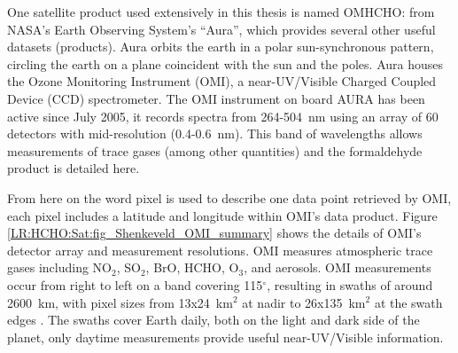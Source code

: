   One satellite product used extensively in this thesis is named OMHCHO: from NASA's Earth Observing System's ``Aura'', which provides several other useful datasets (products).
  Aura orbits the earth in a polar sun-synchronous pattern, circling the earth on a plane coincident with the sun and the poles.
  Aura houses the Ozone Monitoring Instrument (OMI), a near-UV/Visible Charged Coupled Device (CCD) spectrometer.
  The OMI instrument on board AURA has been active since July 2005, it records spectra from 264-504~nm using an array of 60 detectors with mid-resolution (0.4-0.6~nm).
  This band of wavelengths allows measurements of trace gases (among other quantities) and the formaldehyde product is detailed here.
  
  
  From here on the word pixel is used to describe one data point retrieved by OMI, each pixel includes a latitude and longitude within OMI's data product.
  Figure \ref{LR:HCHO:Sat:fig_Shenkeveld_OMI_summary} shows the details of OMI's detector array and measurement resolutions.
  OMI measures atmospheric trace gases including NO$_2$, SO$_2$, BrO, HCHO, O$_3$, and aerosols.
  OMI measurements occur from right to left on a band covering 115$^{\circ}$, resulting in swaths of around 2600~km, with pixel sizes from 13x24~km$^2$ at nadir to 26x135~km$^2$ at the swath edges \parencite{Abad2015}.
  The swaths cover Earth daily, both on the light and dark side of the planet, only daytime measurements provide useful near-UV/Visible information.
  
